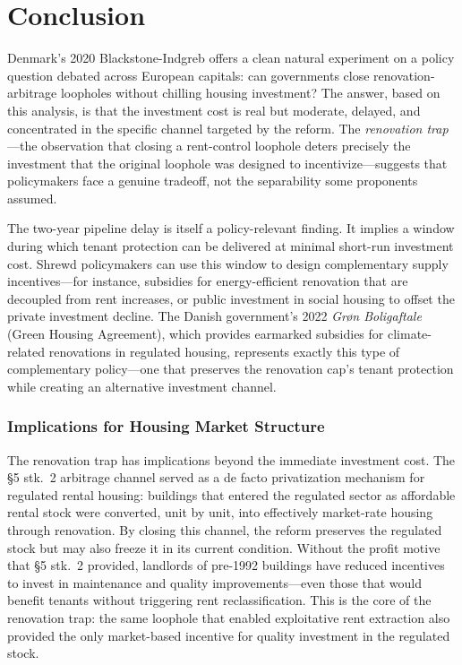 \documentclass[12pt]{article}
\begin{document}
\section{Conclusion}

Denmark's 2020 Blackstone-Indgreb offers a clean natural experiment on a policy question debated across European capitals: can governments close renovation-arbitrage loopholes without chilling housing investment? The answer, based on this analysis, is that the investment cost is real but moderate, delayed, and concentrated in the specific channel targeted by the reform. The \emph{renovation trap}---the observation that closing a rent-control loophole deters precisely the investment that the original loophole was designed to incentivize---suggests that policymakers face a genuine tradeoff, not the separability some proponents assumed.

The two-year pipeline delay is itself a policy-relevant finding. It implies a window during which tenant protection can be delivered at minimal short-run investment cost. Shrewd policymakers can use this window to design complementary supply incentives---for instance, subsidies for energy-efficient renovation that are decoupled from rent increases, or public investment in social housing to offset the private investment decline. The Danish government's 2022 \emph{Gr{\o}n Boligaftale} (Green Housing Agreement), which provides earmarked subsidies for climate-related renovations in regulated housing, represents exactly this type of complementary policy---one that preserves the renovation cap's tenant protection while creating an alternative investment channel.

\subsubsection*{Implications for Housing Market Structure} The renovation trap has implications beyond the immediate investment cost. The \S5 stk.\ 2 arbitrage channel served as a de facto privatization mechanism for regulated rental housing: buildings that entered the regulated sector as affordable rental stock were converted, unit by unit, into effectively market-rate housing through renovation. By closing this channel, the reform preserves the regulated stock but may also freeze it in its current condition. Without the profit motive that \S5 stk.\ 2 provided, landlords of pre-1992 buildings have reduced incentives to invest in maintenance and quality improvements---even those that would benefit tenants without triggering rent reclassification. This is the core of the renovation trap: the same loophole that enabled exploitative rent extraction also provided the only market-based incentive for quality investment in the regulated stock.
\end{document}
